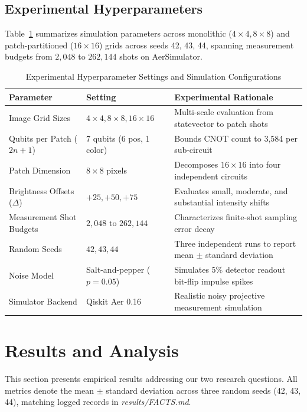 \documentclass[12pt,onecolumn,draftclsnofoot]{IEEEtran}
\begin{document}
\subsection{Experimental Hyperparameters}
Table~\ref{tab:params} summarizes simulation parameters across monolithic ($4\times4, 8\times8$) and patch-partitioned ($16\times16$) grids across seeds 42, 43, 44, spanning measurement budgets from $2{,}048$ to $262{,}144$ shots on AerSimulator.

\begin{table}[t]
\centering
\caption{Experimental Hyperparameter Settings and Simulation Configurations}
\label{tab:params}
\footnotesize
\begin{tabular}{@{}lll@{}}
\toprule
\textbf{Parameter} & \textbf{Setting} & \textbf{Experimental Rationale} \\
\midrule
Image Grid Sizes & $4\times4, 8\times8, 16\times16$ & Multi-scale evaluation from statevector to patch shots \\
Qubits per Patch ($2n+1$) & 7 qubits (6 pos, 1 color) & Bounds CNOT count to 3,584 per sub-circuit \\
Patch Dimension & $8 \times 8$ pixels & Decomposes $16\times16$ into four independent circuits \\
Brightness Offsets ($\Delta$) & $+25, +50, +75$ & Evaluates small, moderate, and substantial intensity shifts \\
Measurement Shot Budgets & $2{,}048$ to $262{,}144$ & Characterizes finite-shot sampling error decay \\
Random Seeds & $42, 43, 44$ & Three independent runs to report mean $\pm$ standard deviation \\
Noise Model & Salt-and-pepper ($p=0.05$) & Simulates 5\% detector readout bit-flip impulse spikes \\
Simulator Backend & Qiskit Aer 0.16 & Realistic noisy projective measurement simulation \\
\bottomrule
\end{tabular}
\end{table}

\section{Results and Analysis}
This section presents empirical results addressing our two research questions. All metrics denote the mean $\pm$ standard deviation across three random seeds (42, 43, 44), matching logged records in \emph{results/FACTS.md}.
\end{document}
